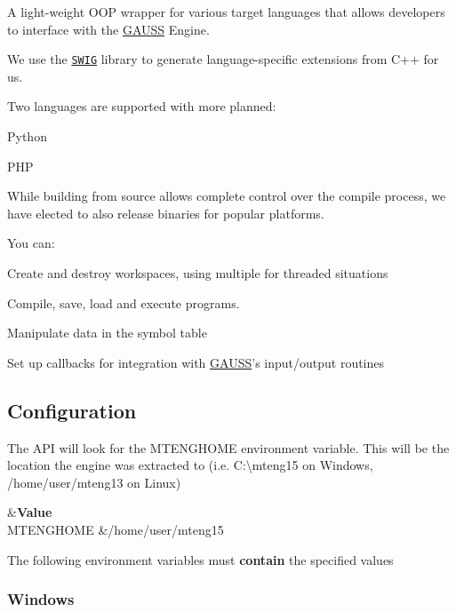 A light-\/weight O\-O\-P wrapper for various target languages that allows developers to interface with the \hyperlink{class_g_a_u_s_s}{G\-A\-U\-S\-S} Engine.

We use the \href{http://www.swig.org}{\tt S\-W\-I\-G} library to generate language-\/specific extensions from C++ for us.

Two languages are supported with more planned\-:


\begin{DoxyItemize}
\item Python
\item P\-H\-P
\end{DoxyItemize}

While building from source allows complete control over the compile process, we have elected to also release binaries for popular platforms.

You can\-:
\begin{DoxyItemize}
\item Create and destroy workspaces, using multiple for threaded situations
\item Compile, save, load and execute programs.
\item Manipulate data in the symbol table
\item Set up callbacks for integration with \hyperlink{class_g_a_u_s_s}{G\-A\-U\-S\-S}'s input/output routines
\end{DoxyItemize}

\subsection*{Configuration}

The A\-P\-I will look for the {\ttfamily M\-T\-E\-N\-G\-H\-O\-M\-E} environment variable. This will be the location the engine was extracted to (i.\-e. {\ttfamily C\-:\textbackslash{}mteng15} on Windows, {\ttfamily /home/user/mteng13} on Linux)

\begin{TabularC}{2}
\hline
{}&{\bf Value}\\
{\ttfamily M\-T\-E\-N\-G\-H\-O\-M\-E} &{\ttfamily /home/user/mteng15} \\
\end{TabularC}


The following environment variables must {\bfseries contain} the specified values

\subsubsection*{Windows}

